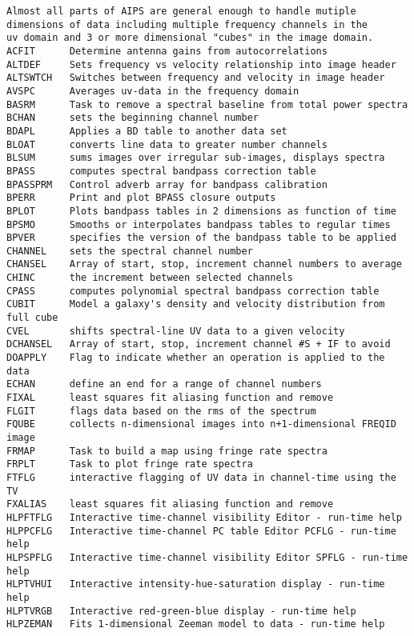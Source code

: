 \vskip 0.5pt
\bbve\begin{verbatim}
Almost all parts of AIPS are general enough to handle mutiple
dimensions of data including multiple frequency channels in the
uv domain and 3 or more dimensional "cubes" in the image domain.
ACFIT      Determine antenna gains from autocorrelations
ALTDEF     Sets frequency vs velocity relationship into image header
ALTSWTCH   Switches between frequency and velocity in image header
AVSPC      Averages uv-data in the frequency domain
BASRM      Task to remove a spectral baseline from total power spectra
BCHAN      sets the beginning channel number
BDAPL      Applies a BD table to another data set
BLOAT      converts line data to greater number channels
BLSUM      sums images over irregular sub-images, displays spectra
BPASS      computes spectral bandpass correction table
BPASSPRM   Control adverb array for bandpass calibration
BPERR      Print and plot BPASS closure outputs
BPLOT      Plots bandpass tables in 2 dimensions as function of time
BPSMO      Smooths or interpolates bandpass tables to regular times
BPVER      specifies the version of the bandpass table to be applied
CHANNEL    sets the spectral channel number
CHANSEL    Array of start, stop, increment channel numbers to average
CHINC      the increment between selected channels
CPASS      computes polynomial spectral bandpass correction table
CUBIT      Model a galaxy's density and velocity distribution from full cube
CVEL       shifts spectral-line UV data to a given velocity
DCHANSEL   Array of start, stop, increment channel #S + IF to avoid
DOAPPLY    Flag to indicate whether an operation is applied to the data
ECHAN      define an end for a range of channel numbers
FIXAL      least squares fit aliasing function and remove
FLGIT      flags data based on the rms of the spectrum
FQUBE      collects n-dimensional images into n+1-dimensional FREQID image
FRMAP      Task to build a map using fringe rate spectra
FRPLT      Task to plot fringe rate spectra
FTFLG      interactive flagging of UV data in channel-time using the TV
FXALIAS    least squares fit aliasing function and remove
HLPFTFLG   Interactive time-channel visibility Editor - run-time help
HLPPCFLG   Interactive time-channel PC table Editor PCFLG - run-time help
HLPSPFLG   Interactive time-channel visibility Editor SPFLG - run-time help
HLPTVHUI   Interactive intensity-hue-saturation display - run-time help
HLPTVRGB   Interactive red-green-blue display - run-time help
HLPZEMAN   Fits 1-dimensional Zeeman model to data - run-time help

\end{verbatim}
